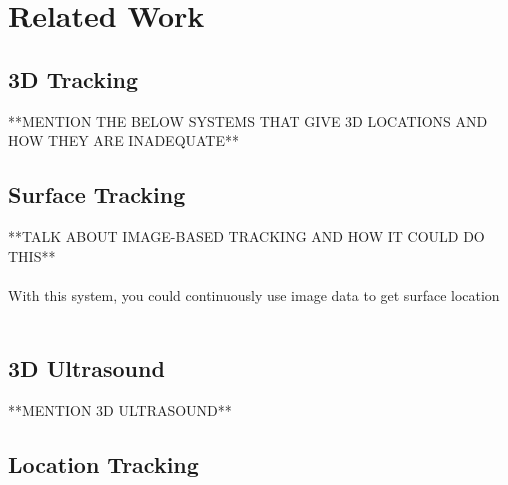 \section{Related Work}

\subsection{3D Tracking}

**MENTION THE BELOW SYSTEMS THAT GIVE 3D LOCATIONS AND HOW THEY ARE INADEQUATE**

\subsection{Surface Tracking}

**TALK ABOUT IMAGE-BASED TRACKING AND HOW IT COULD DO THIS**\\
\\
With this system, you could continuously use image data to get surface location\\
\\
\subsection{3D Ultrasound}

**MENTION 3D ULTRASOUND**


\subsection{Location Tracking}

